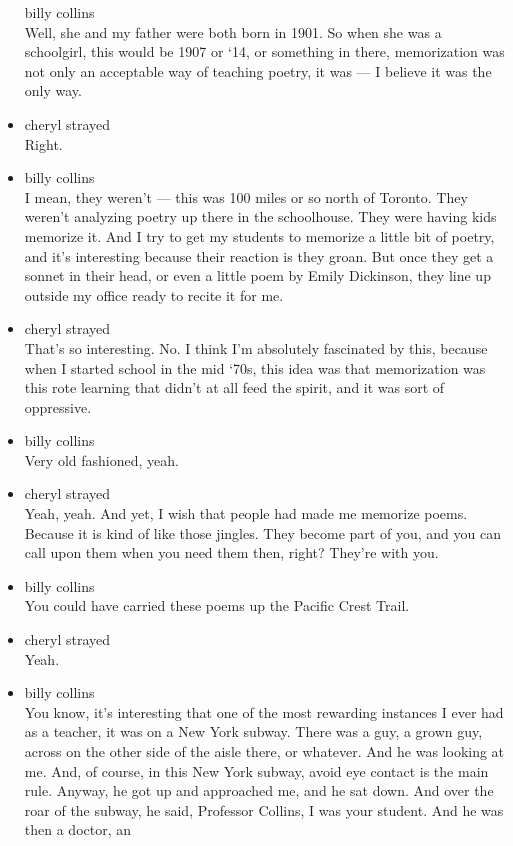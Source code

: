 \begin{itemize}
  billy collins\\
  Well, she and my father were both born in 1901. So when she was a
  schoolgirl, this would be 1907 or `14, or something in there,
  memorization was not only an acceptable way of teaching poetry, it was
  --- I believe it was the only way.
\item
  cheryl strayed\\
  Right.
\item
  billy collins\\
  I mean, they weren't --- this was 100 miles or so north of Toronto.
  They weren't analyzing poetry up there in the schoolhouse. They were
  having kids memorize it. And I try to get my students to memorize a
  little bit of poetry, and it's interesting because their reaction is
  they groan. But once they get a sonnet in their head, or even a little
  poem by Emily Dickinson, they line up outside my office ready to
  recite it for me.
\item
  cheryl strayed\\
  That's so interesting. No. I think I'm absolutely fascinated by this,
  because when I started school in the mid `70s, this idea was that
  memorization was this rote learning that didn't at all feed the
  spirit, and it was sort of oppressive.
\item
  billy collins\\
  Very old fashioned, yeah.
\item
  cheryl strayed\\
  Yeah, yeah. And yet, I wish that people had made me memorize poems.
  Because it is kind of like those jingles. They become part of you, and
  you can call upon them when you need them then, right? They're with
  you.
\item
  billy collins\\
  You could have carried these poems up the Pacific Crest Trail.
\item
  cheryl strayed\\
  Yeah.
\item
  billy collins\\
  You know, it's interesting that one of the most rewarding instances I
  ever had as a teacher, it was on a New York subway. There was a guy, a
  grown guy, across on the other side of the aisle there, or whatever.
  And he was looking at me. And, of course, in this New York subway,
  avoid eye contact is the main rule. Anyway, he got up and approached
  me, and he sat down. And over the roar of the subway, he said,
  Professor Collins, I was your student. And he was then a doctor, an

\end{itemize}

